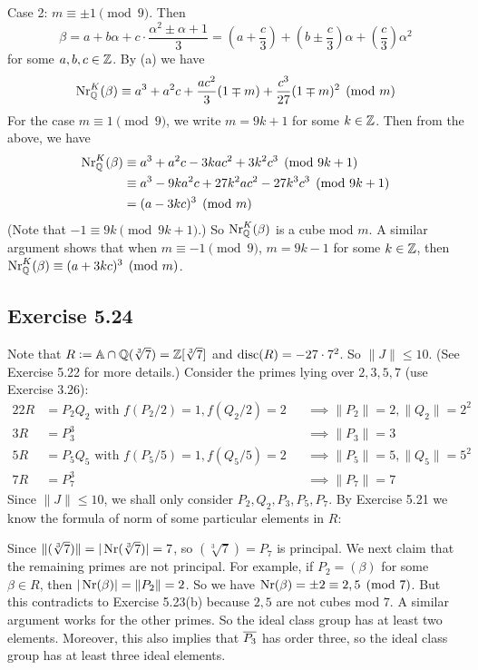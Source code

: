 \documentclass[../Marcus.tex]{subfiles}
\begin{document}
Case 2: $m\equiv\pm1\pmod{9}$. Then
$$
\beta = a + b\alpha + c \cdot \frac{\alpha^2 \pm \alpha + 1}{3}
= \left(a+\frac{c}{3}\right) + \left(b\pm\frac{c}{3}\right)\alpha + \left(\frac{c}{3}\right)\alpha^2
$$
for some $a,b,c\in \mathbb{Z}$. By (a) we have
$$
\operatorname{Nr}^K_{\mathbb{Q}}(\beta) \equiv a^3 + a^2c + \frac{ac^2}{3}(1 \mp m) + \frac{c^3}{27}(1\mp m)^2  \pmod{m}
$$
For the case $m\equiv 1\pmod{9}$, we write $m = 9k+1$ for some $k\in\mathbb{Z}$. Then from the above, we have
\begin{align*}
\operatorname{Nr}^K_{\mathbb{Q}}(\beta) 
&\equiv a^3 + a^2c - 3kac^2 + 3k^2c^3  \pmod{9k+1}    \\
&\equiv a^3 - 9ka^2c + 27k^2ac^2 - 27k^3c^3  \pmod{9k+1}    \\
&= (a-3kc)^3 \pmod{m}
\end{align*}
(Note that $-1 \equiv 9k \pmod{9k+1}$.) So $\operatorname{Nr}^K_{\mathbb{Q}}(\beta)$ is a cube mod $m$. A similar argument shows that when $m\equiv -1\pmod{9}$, $m = 9k-1$ for some $k\in\mathbb{Z}$, then $\operatorname{Nr}^K_{\mathbb{Q}}(\beta) \equiv (a+3kc)^3 \pmod{m}$.

\subsection*{Exercise 5.24}

Note that $R := \mathbb{A} \cap \mathbb{Q}(\sqrt[3]{7}) = \mathbb{Z}[\sqrt[3]{7}]$ and $\operatorname{disc}(R) = -27 \cdot 7^2$. So $\|J\| \leq 10$. (See Exercise 5.22 for more details.) Consider the primes lying over $2,3,5,7$ (use Exercise 3.26):
\begin{alignat*}{2}
2R &= P_2Q_2 \text{ with } f(P_2/2) = 1, f(Q_2/2) = 2 &&\implies \|P_2\| = 2, \|Q_2\| = 2^2    \\
3R &= P_3^3 &&\implies \|P_3\| = 3    \\
5R &= P_5Q_5 \text{ with } f(P_5/5) = 1, f(Q_5/5) = 2 &&\implies \|P_5\| = 5, \|Q_5\| = 5^2    \\
7R &= P_7^3 &&\implies \|P_7\| = 7
\end{alignat*}
Since $\|J\| \leq 10$, we shall only consider $P_2,Q_2,P_3,P_5,P_7$. By Exercise 5.21 we know the formula of norm of some particular elements in $R$:

Since $\|(\sqrt[3]{7})\| = |\operatorname{Nr}(\sqrt[3]{7})| = 7$, so $(\sqrt[3]{7}) = P_7$ is principal. We next claim that the remaining primes are not principal. For example, if $P_2 = (\beta)$ for some $\beta \in R$, then $|\operatorname{Nr}(\beta)| = \|P_2\| = 2$. So we have $\operatorname{Nr}(\beta) = \pm2 \equiv 2,5 \pmod{7}$. But this contradicts to Exercise 5.23(b) because $2,5$ are not cubes mod $7$. A similar argument works for the other primes. So the ideal class group has at least two elements. Moreover, this also implies that $\overline{P_3}$ has order three, so the ideal class group has at least three ideal elements.
\end{document}
